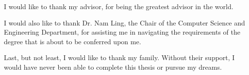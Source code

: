 I would like to thank my advisor, for being the greatest advisor in the world.

I would also like to thank Dr. Nam Ling, the Chair of the Computer Science and Engineering Department, for assisting me in navigating the requirements of the degree that is about to be conferred upon me.

Last, but not least, I would like to thank my family. Without their support, I would have never been able to complete this thesis or pursue my dreams.
